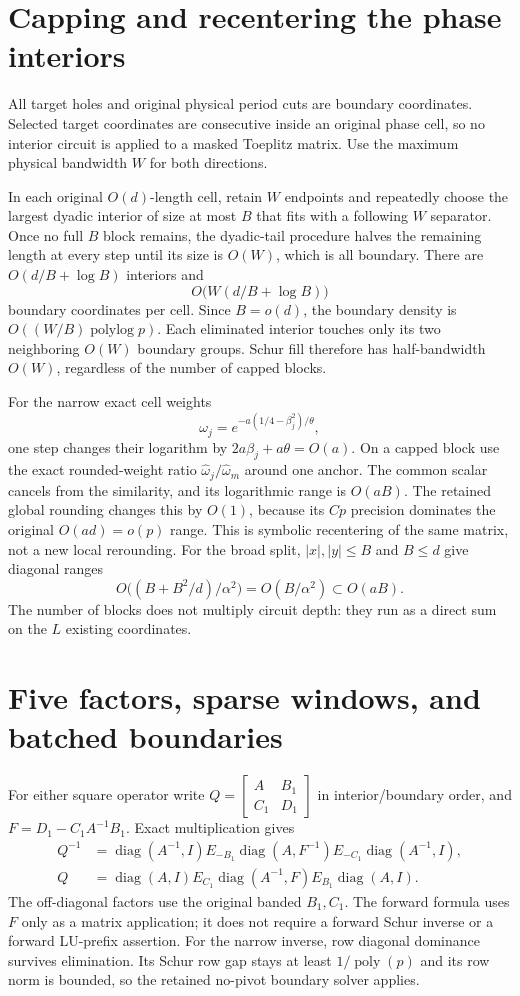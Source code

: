 \documentclass[11pt]{article}
\newcommand{\diag}{\operatorname{diag}}
\newcommand{\poly}{\operatorname{poly}}
\newcommand{\plog}{\operatorname{polylog}}
\begin{document}
\section{Capping and recentering the phase interiors}

All target holes and original physical period cuts are boundary coordinates. Selected target coordinates are consecutive inside an original phase cell, so no interior circuit is applied to a masked Toeplitz matrix. Use the maximum physical bandwidth $W$ for both directions.

In each original $O(d)$-length cell, retain $W$ endpoints and repeatedly choose the largest dyadic interior of size at most $B$ that fits with a following $W$ separator. Once no full $B$ block remains, the dyadic-tail procedure halves the remaining length at every step until its size is $O(W)$, which is all boundary. There are $O(d/B+\log B)$ interiors and
\[
 O\bigl(W(d/B+\log B)\bigr)
\]
boundary coordinates per cell. Since $B=o(d)$, the boundary density is $O((W/B)\plog p)$. Each eliminated interior touches only its two neighboring $O(W)$ boundary groups. Schur fill therefore has half-bandwidth $O(W)$, regardless of the number of capped blocks.

For the narrow exact cell weights
\[
 \omega_j=e^{-a(1/4-\beta_j^2)/\theta},
\]
one step changes their logarithm by $2a\beta_j+a\theta=O(a)$. On a capped block use the exact rounded-weight ratio $\widehat\omega_j/\widehat\omega_m$ around one anchor. The common scalar cancels from the similarity, and its logarithmic range is $O(aB)$. The retained global rounding changes this by $O(1)$, because its $Cp$ precision dominates the original $O(ad)=o(p)$ range. This is symbolic recentering of the same matrix, not a new local rerounding. For the broad split, $|x|,|y|\leq B$ and $B\leq d$ give diagonal ranges
\[
 O\bigl((B+B^2/d)/\alpha^2\bigr)=O(B/\alpha^2)\subset O(aB).
\]
The number of blocks does not multiply circuit depth: they run as a direct sum on the $L$ existing coordinates.

\section{Five factors, sparse windows, and batched boundaries}

For either square operator write $Q=\left[\begin{smallmatrix}A&B_1\\C_1&D_1\end{smallmatrix}\right]$ in interior/boundary order, and $F=D_1-C_1A^{-1}B_1$. Exact multiplication gives
\begin{align}
 Q^{-1}&=\diag(A^{-1},I)E_{-B_1}\diag(A,F^{-1})
                   E_{-C_1}\diag(A^{-1},I),\\
 Q&=\diag(A,I)E_{C_1}\diag(A^{-1},F)E_{B_1}\diag(A,I).
\end{align}
The off-diagonal factors use the original banded $B_1,C_1$. The forward formula uses $F$ only as a matrix application; it does not require a forward Schur inverse or a forward LU-prefix assertion. For the narrow inverse, row diagonal dominance survives elimination. Its Schur row gap stays at least $1/\poly(p)$ and its row norm is bounded, so the retained no-pivot boundary solver applies.
\end{document}
